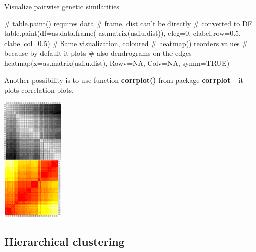 \documentclass[compress, ucs, xelatex, 11pt, xcolor=svgnames,
  hyperref={
    bookmarks=true,
    unicode=true,
    colorlinks=true,
    pdftitle={Molecular data in R},
    plainpages=false,
    pdfauthor={Vojtech Zeisek},
    pdfsubject={Course about phylogeny and evolution in R},
    pdfcreator={XeLaTeX},
    pdfkeywords={R, evolution, phylogeny, molecular data},
    linkcolor=Tomato,
    anchorcolor=SaddleBrown,
    citecolor=Goldenrod,
    filecolor=DarkMagenta,
    menucolor=Sienna,
    urlcolor=DarkTurquoise,
    pdftex},
  url={hyphens, lowtilde} %
  ]{beamer}
\begin{document}
\begin{frame}[fragile]{Visualize pairwise genetic similarities}
\begin{multicols}{2}
\vfil
  \begin{spluscode}
    # table.paint() requires data
    # frame, dist can't be directly
    # converted to DF
    table.paint(df=as.data.frame(
      as.matrix(usflu.dist)), cleg=0,
      clabel.row=0.5, clabel.col=0.5)
    # Same visualization, coloured
    # heatmap() reorders values
    # because by default it plots
    # also dendrograms on the edges
    heatmap(x=as.matrix(usflu.dist),
      Rowv=NA, Colv=NA, symm=TRUE)
  \end{spluscode}
\vfil
  Another possibility is to use function \textbf{corrplot()} from package \textbf{corrplot} -- it plots correlation plots.
\vfil
  \columnbreak
  \begin{center}
    \includegraphics[height=6cm]{dna-dists.png}
  \end{center}
\end{multicols}
\end{frame}

\subsection{Hierarchical clustering}
\end{document}
